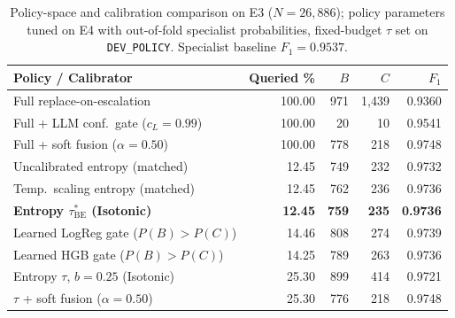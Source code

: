 \documentclass[conference,a4paper]{IEEEtran}
\begin{document}
\begin{table}[!t]
\caption{Policy-space and calibration comparison on E3 ($N=26{,}886$); policy
parameters tuned on E4 with out-of-fold specialist probabilities, fixed-budget
$\tau$ set on {\upshape\texttt{DEV\_POLICY}}. Specialist baseline $F_1=0.9537$.}
\label{tab:policies}
\centering
\scriptsize
\setlength{\tabcolsep}{2.8pt}
\begin{tabular}{lrrrr}
\toprule
Policy / Calibrator & Queried \% & $B$ & $C$ & $F_1$ \\
\midrule
Full replace-on-escalation & 100.00 & 971 & 1{,}439 & 0.9360 \\
Full + LLM conf.\ gate ($c_L{=}0.99$) & 100.00 & 20 & 10 & 0.9541 \\
Full + soft fusion ($\alpha{=}0.50$) & 100.00 & 778 & 218 & 0.9748 \\
\midrule
Uncalibrated entropy (matched) & 12.45 & 749 & 232 & 0.9732 \\
Temp.\ scaling entropy (matched) & 12.45 & 762 & 236 & 0.9736 \\
\textbf{Entropy $\tau^{\ast}_{\mathrm{BE}}$ (Isotonic)} & \textbf{12.45} & \textbf{759} & \textbf{235} & \textbf{0.9736} \\
Learned LogReg gate ($P(B){>}P(C)$) & 14.46 & 808 & 274 & 0.9739 \\
Learned HGB gate ($P(B){>}P(C)$) & 14.25 & 789 & 263 & 0.9736 \\
\midrule
Entropy $\tau$, $b{=}0.25$ (Isotonic) & 25.30 & 899 & 414 & 0.9721 \\
$\tau$ + soft fusion ($\alpha{=}0.50$) & 25.30 & 776 & 218 & 0.9748 \\
\bottomrule
\end{tabular}
\end{table}
\end{document}
